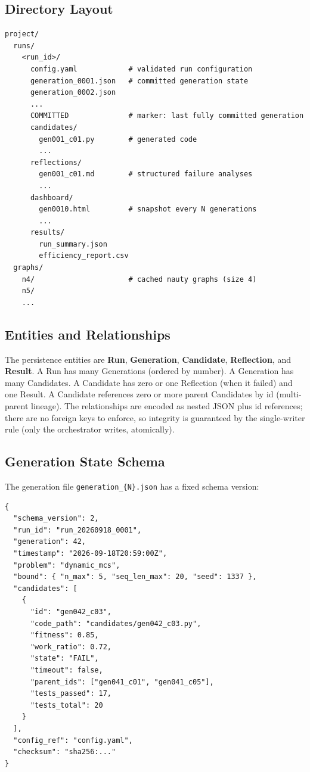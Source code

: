 \documentclass[12pt,a4paper]{article}
\begin{document}
\subsection{Directory Layout}

\begin{verbatim}
project/
  runs/
    <run_id>/
      config.yaml            # validated run configuration
      generation_0001.json   # committed generation state
      generation_0002.json
      ...
      COMMITTED              # marker: last fully committed generation
      candidates/
        gen001_c01.py        # generated code
        ...
      reflections/
        gen001_c01.md        # structured failure analyses
        ...
      dashboard/
        gen0010.html         # snapshot every N generations
        ...
      results/
        run_summary.json
        efficiency_report.csv
  graphs/
    n4/                      # cached nauty graphs (size 4)
    n5/
    ...
\end{verbatim}

\subsection{Entities and Relationships}

The persistence entities are \textbf{Run}, \textbf{Generation}, \textbf{Candidate}, \textbf{Reflection}, and \textbf{Result}. A Run has many Generations (ordered by number). A Generation has many Candidates. A Candidate has zero or one Reflection (when it failed) and one Result. A Candidate references zero or more parent Candidates by id (multi-parent lineage). The relationships are encoded as nested JSON plus id references; there are no foreign keys to enforce, so integrity is guaranteed by the single-writer rule (only the orchestrator writes, atomically).

\subsection{Generation State Schema}

The generation file \texttt{generation\_\{N\}.json} has a fixed schema version:

\begin{verbatim}
{
  "schema_version": 2,
  "run_id": "run_20260918_0001",
  "generation": 42,
  "timestamp": "2026-09-18T20:59:00Z",
  "problem": "dynamic_mcs",
  "bound": { "n_max": 5, "seq_len_max": 20, "seed": 1337 },
  "candidates": [
    {
      "id": "gen042_c03",
      "code_path": "candidates/gen042_c03.py",
      "fitness": 0.85,
      "work_ratio": 0.72,
      "state": "FAIL",
      "timeout": false,
      "parent_ids": ["gen041_c01", "gen041_c05"],
      "tests_passed": 17,
      "tests_total": 20
    }
  ],
  "config_ref": "config.yaml",
  "checksum": "sha256:..."
}
\end{verbatim}
\end{document}
